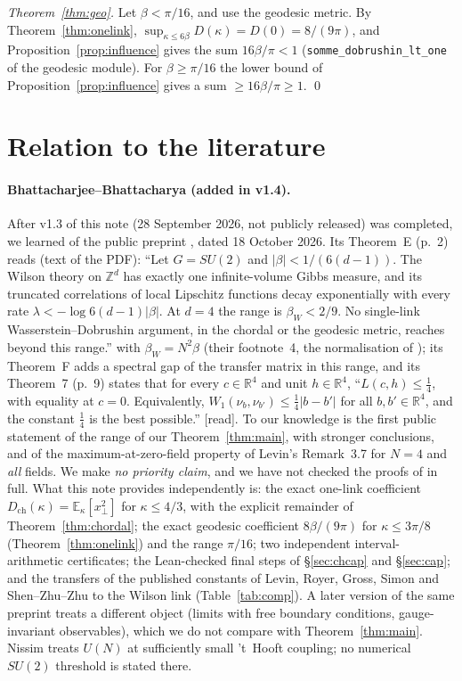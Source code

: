 \documentclass[11pt,a4paper]{article}
\theoremstyle{remark}
\theoremstyle{definition}
\newcommand{\R}{\mathbb{R}}
\newcommand{\E}{\mathbb{E}}
\newcommand{\st}[1]{\textsf{[#1]}}
\newcommand{\Dch}{D_{\mathrm{ch}}}
\begin{document}
\emph{Theorem~\ref{thm:geo}.} Let $\beta<\pi/16$, and use the geodesic metric. By Theorem~\ref{thm:onelink},
$\sup_{\kappa\le6\beta}D(\kappa)=D(0)=8/(9\pi)$, and Proposition~\ref{prop:influence} gives the sum $16\beta/\pi<1$
(\texttt{somme\_dobrushin\_lt\_one} of the geodesic module). For $\beta\ge\pi/16$ the lower bound of
Proposition~\ref{prop:influence} gives a sum $\ge16\beta/\pi\ge1$. \qed

\section{Relation to the literature}\label{sec:lit}

\paragraph{Bhattacharjee--Bhattacharya \cite{BB26} (added in v1.4).} After v1.3 of this note (28 September 2026,
not publicly released) was completed, we learned of the public preprint \cite{BB26}, dated 18 October 2026. Its
Theorem~E (p.~2) reads (text of the PDF): ``Let $G=SU(2)$ and $|\beta|<1/(6(d-1))$. The Wilson theory on $\mathbb Z^d$
has exactly one infinite-volume Gibbs measure, and its truncated correlations of local Lipschitz functions decay
exponentially with every rate $\lambda<-\log 6(d-1)|\beta|$. At $d=4$ the range is $\beta_W<2/9$. No single-link
Wasserstein--Dobrushin argument, in the chordal or the geodesic metric, reaches beyond this range.'' with
$\beta_W=N^2\beta$ (their footnote~4, the normalisation of \cite{SZZ23}); its Theorem~F adds a spectral gap of the
transfer matrix in this range, and its Theorem~7 (p.~9) states that for every $c\in\R^4$ and unit $h\in\R^4$,
``$L(c,h)\le\frac14$, with equality at $c=0$. Equivalently, $W_1(\nu_b,\nu_{b'})\le\frac14|b-b'|$ for all
$b,b'\in\R^4$, and the constant $\frac14$ is the best possible.'' \st{read}. To our knowledge \cite{BB26} is the
first public statement of the range of our Theorem~\ref{thm:main}, with stronger conclusions, and of the
maximum-at-zero-field property of Levin's Remark~3.7 for $N=4$ and \emph{all} fields. We make \emph{no priority
claim}, and we have not checked the proofs of \cite{BB26} in full. What this note provides independently is: the
exact one-link coefficient $\Dch(\kappa)=\E_\kappa[x_\perp^2]$ for $\kappa\le4/3$, with the explicit remainder of
Theorem~\ref{thm:chordal}; the exact geodesic coefficient $8\beta/(9\pi)$ for $\kappa\le3\pi/8$
(Theorem~\ref{thm:onelink}) and the range $\pi/16$; two independent interval-arithmetic certificates; the
Lean-checked final steps of \S\ref{sec:chcap} and \S\ref{sec:cap}; and the transfers of the published constants
of Levin, Royer, Gross, Simon and Shen--Zhu--Zhu to the Wilson link (Table~\ref{tab:comp}). A later version of
the same preprint treats a different object (limits with free boundary conditions, gauge-invariant observables),
which we do not compare with Theorem~\ref{thm:main}. Nissim \cite{Nis25} treats $U(N)$ at sufficiently small
't~Hooft coupling; no numerical $SU(2)$ threshold is stated there.
\end{document}
